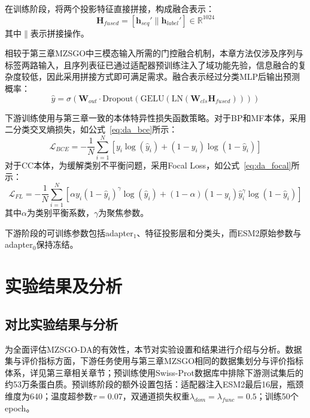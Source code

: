 在训练阶段，将两个投影特征直接拼接，构成融合表示：
\begin{equation}
    \mathbf{H}_{fused} = [\mathbf{h}_{seq}' \parallel \mathbf{h}_{label}'] \in \mathbb{R}^{1024}
\end{equation}
其中$\parallel$表示拼接操作。

相较于第三章MZSGO中三模态输入所需的门控融合机制，本章方法仅涉及序列与标签两路输入，且序列表征已通过适配器预训练注入了域功能先验，信息融合的复杂度较低，因此采用拼接方式即可满足需求。融合表示经过分类MLP后输出预测概率：
\begin{equation}
    \hat{y} = \sigma\left(\mathbf{W}_{out}\cdot \text{Dropout}\left(\text{GELU}\left(\text{LN}(\mathbf{W}_{cls}\mathbf{H}_{fused})\right)\right)\right)
\end{equation}

下游训练使用与第三章一致的本体特异性损失函数策略。对于BP和MF本体，采用二分类交叉熵损失，如公式~\eqref{eq:da_bce}所示：
\begin{equation}
\label{eq:da_bce}
    \mathcal{L}_{BCE} = -\frac{1}{N}\sum_{i=1}^{N}
    \left[
    y_i\log(\hat{y}_i) + (1-y_i)\log(1-\hat{y}_i)
    \right]
\end{equation}
对于CC本体，为缓解类别不平衡问题，采用Focal Loss，如公式~\eqref{eq:da_focal}所示：
\begin{equation}
\label{eq:da_focal}
    \mathcal{L}_{FL} = -\frac{1}{N}\sum_{i=1}^{N}
    \left[
    \alpha y_i(1-\hat{y}_i)^{\gamma}\log(\hat{y}_i)
    + (1-\alpha)(1-y_i)\hat{y}_i^{\gamma}\log(1-\hat{y}_i)
    \right]
\end{equation}
其中$\alpha$为类别平衡系数，$\gamma$为聚焦参数。

下游阶段的可训练参数包括adapter$_1$、特征投影层和分类头，而ESM2原始参数与adapter$_0$保持冻结。

\section{实验结果及分析}

\subsection{对比实验结果与分析}

为全面评估MZSGO-DA的有效性，本节对实验设置和结果进行介绍与分析。数据集与评价指标方面，下游任务使用与第三章MZSGO相同的数据集划分与评价指标体系，详见第三章相关章节；预训练使用Swiss-Prot数据库中排除下游测试集后的约53万条蛋白质。预训练阶段的额外设置包括：适配器注入ESM2最后16层，瓶颈维度为640；温度超参数$\tau=0.07$，双通道损失权重$\lambda_{dom}=\lambda_{func}=0.5$；训练50个epoch。

